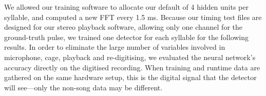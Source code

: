 \documentclass[10pt,letterpaper]{article}
\let\oldmarginpar\marginpar
\renewcommand{\marginpar}[1]{\oldmarginpar{\linespread{1}\scriptsize{#1}}}
\begin{document}
We allowed our training software to allocate our default of 4 hidden units per syllable, and computed a new FFT every 1.5 ms.  Because our timing test files are designed for our stereo playback software, allowing only one channel for the ground-truth pulse, we trained one detector for each syllable for the following results.  In order to eliminate the large number of variables involved in microphone, cage, playback and re-digitising, we evaluated the neural network's accuracy directly on the digitised recording.  When training and runtime data are gathered on the same hardware setup, this is the digital signal that the detector will see---only the non-song data may be different.
\end{document}
